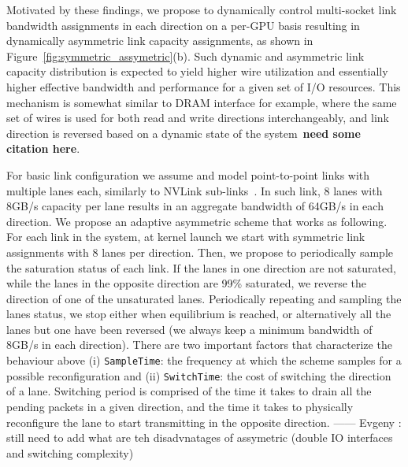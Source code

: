 Motivated by these findings, we propose to dynamically control multi-socket
link bandwidth assignments in each direction on a per-GPU basis resulting in
dynamically asymmetric link capacity assignments, as shown in
Figure~\ref{fig:symmetric_assymetric}(b). Such dynamic and asymmetric link
capacity distribution is expected to yield higher wire utilization and
essentially higher effective bandwidth and performance for a given set of I/O
resources. This mechanism is somewhat similar to DRAM interface for example,
where the same set of wires is used for both read and write directions
interchangeably, and link direction is reversed based on a dynamic state of the
system~\textbf{need some citation here}. 

For basic link configuration we assume and model point-to-point
links with multiple lanes each, similarly to NVLink
sub-links~\cite{pascal-tesla-wp}.  In such link, 8 lanes with 8GB/s capacity
per lane results in an aggregate bandwidth of 64GB/s in each direction. We
propose an adaptive asymmetric scheme that works as following. For each link
in the system, at kernel launch we start with symmetric link assignments with 8
lanes per direction. Then, we propose to periodically sample the saturation
status of each link. If the lanes in one direction are not saturated, while the
lanes in the opposite direction are 99\% saturated, we reverse the direction of
one of the unsaturated lanes. Periodically repeating and sampling the lanes
status, we stop either when equilibrium is reached, or alternatively all the 
lanes but one have been reversed (we always keep a minimum bandwidth of 8GB/s 
in each direction).  
There are two important factors that characterize the behaviour above (i) 
\texttt{SampleTime}: the frequency at which the scheme samples for a possible 
reconfiguration and (ii) \texttt{SwitchTime}: the cost of switching the 
direction of a lane. Switching period is comprised of the time it takes to 
drain all the pending packets in a given direction, and the time it takes to 
physically reconfigure the lane to start transmitting in the opposite 
direction. 
------  Evgeny : still need to add what are teh disadvnatages of assymetric
(double IO interfaces and switching complexity)



